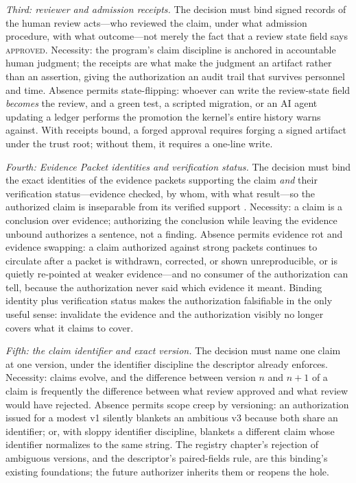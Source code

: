 \emph{Third: reviewer and admission receipts.} The decision must bind signed records of the human review acts---who reviewed the claim, under what admission procedure, with what outcome---not merely the fact that a review state field says \textsc{approved}. Necessity: the program's claim discipline is anchored in accountable human judgment; the receipts are what make the judgment an artifact rather than an assertion, giving the authorization an audit trail that survives personnel and time. Absence permits state-flipping: whoever can write the review-state field \emph{becomes} the review, and a green test, a scripted migration, or an AI agent updating a ledger performs the promotion the kernel's entire history warns against. With receipts bound, a forged approval requires forging a signed artifact under the trust root; without them, it requires a one-line write.

\emph{Fourth: Evidence Packet identities and verification status.} The decision must bind the exact identities of the evidence packets supporting the claim \emph{and} their verification status---evidence checked, by whom, with what result---so the authorized claim is inseparable from its verified support \cite{prov}. Necessity: a claim is a conclusion over evidence; authorizing the conclusion while leaving the evidence unbound authorizes a sentence, not a finding. Absence permits evidence rot and evidence swapping: a claim authorized against strong packets continues to circulate after a packet is withdrawn, corrected, or shown unreproducible, or is quietly re-pointed at weaker evidence---and no consumer of the authorization can tell, because the authorization never said which evidence it meant. Binding identity plus verification status makes the authorization falsifiable in the only useful sense: invalidate the evidence and the authorization visibly no longer covers what it claims to cover.

\emph{Fifth: the claim identifier and exact version.} The decision must name one claim at one version, under the identifier discipline the descriptor already enforces. Necessity: claims evolve, and the difference between version $n$ and $n{+}1$ of a claim is frequently the difference between what review approved and what review would have rejected. Absence permits scope creep by versioning: an authorization issued for a modest v1 silently blankets an ambitious v3 because both share an identifier; or, with sloppy identifier discipline, blankets a different claim whose identifier normalizes to the same string. The registry chapter's rejection of ambiguous versions, and the descriptor's paired-fields rule, are this binding's existing foundations; the future authorizer inherits them or reopens the hole.

